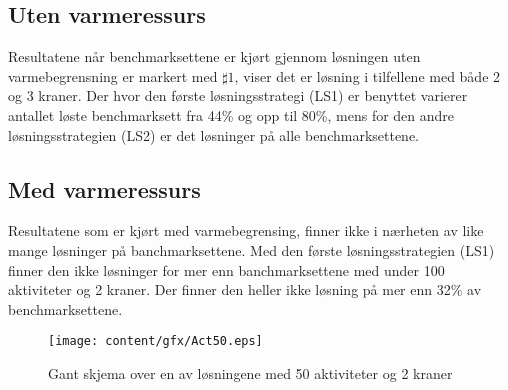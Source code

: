 \subsection{Uten varmeressurs}
Resultatene når benchmarksettene er kjørt gjennom løsningen uten varmebegrensning er markert med $\sharp 1$, viser det er løsning i tilfellene med både 2 og 3 kraner. Der hvor den første løsningsstrategi (LS1) er benyttet varierer antallet løste benchmarksett fra 44\% og opp til 80\%, mens for den andre løsningsstrategien (LS2) er det løsninger på alle benchmarksettene.

\subsection{Med varmeressurs}
Resultatene som er kjørt med varmebegrensing, finner ikke i nærheten av like mange løsninger på banchmarksettene. Med den første løsningsstrategien (LS1) finner den ikke løsninger for mer enn banchmarksettene med under 100 aktiviteter og 2 kraner. Der finner den heller ikke løsning på mer enn 32\% av benchmarksettene.
\begin{figure}[h]
\texttt{[image: content/gfx/Act50.eps]}
\label{fig:50actgant}
\caption{Gant skjema over en av løsningene med 50 aktiviteter og 2 kraner}
\end{figure}